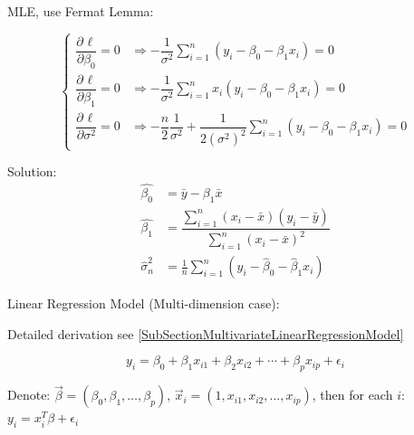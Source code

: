 \begin{enumerate}
    MLE, use Fermat Lemma:

\begin{equation}
    \begin{cases}
        \dfrac{\partial^{} \ell}{\partial \beta _0^{}}=0&\Rightarrow -\dfrac{1}{\sigma ^2}{\displaystyle\sum_{i=1}^n(y_i-\beta _0-\beta _1x_i)}=0\\
        \dfrac{\partial^{} \ell}{\partial \beta _1^{}}=0&\Rightarrow -\dfrac{1}{\sigma ^2}{\displaystyle\sum_{i=1}^nx_i(y_i-\beta _0-\beta _1x_i)}=0\\
        \dfrac{\partial^{} \ell}{\partial \sigma^2}=0&\Rightarrow -\dfrac{n}{2}\dfrac{1}{\sigma ^2}+\dfrac{1}{2(\sigma ^2)^2} {\displaystyle\sum_{i=1}^n(y_i-\beta _0-\beta _1x_i)}=0
    \end{cases} 
\end{equation}

    Solution:
    \begin{align*}
        \hat{\beta_0}&=\bar{y}-\beta_1\bar{x}\\
        \hat{\beta_1}&=\dfrac{\sum_{i=1}^n(x_i-\bar{x})(y_i-\bar{y})}{\sum_{i=1}^n(x_i-\bar{x})^2}\\
        \hat{\sigma}^2_n&=\frac{1}{n}\sum_{i=1}^n(y_i-\hat{\beta}_0-\hat{\beta}_1x_i)
    \end{align*}
    
    
    \end{enumerate}

\begin{point}
    Linear Regression Model (Multi-dimension case):
\end{point}

    Detailed derivation see \autoref{SubSectionMultivariateLinearRegressionModel}
    
\begin{equation}
    y_i=\beta_0+\beta_1x_{i1}+\beta_2x_{i2}+\cdots+\beta_px_{ip}+\epsilon_i    
\end{equation}

    Denote: $\vec{\beta}=(\beta_0,\beta_1,\ldots,\beta_p),\, \vec{x}_i=(1,x_{i1},x_{i2},\ldots,x_{ip})$, then for each $i$: $y_i=x_i^T\beta+\epsilon_i$

